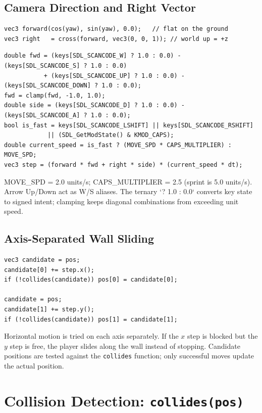 \subsection{Camera Direction and Right Vector}
\begin{verbatim}
vec3 forward(cos(yaw), sin(yaw), 0.0);   // flat on the ground
vec3 right   = cross(forward, vec3(0, 0, 1)); // world up = +z
\end{verbatim}
\begin{verbatim}
double fwd = (keys[SDL_SCANCODE_W] ? 1.0 : 0.0) - (keys[SDL_SCANCODE_S] ? 1.0 : 0.0)
           + (keys[SDL_SCANCODE_UP] ? 1.0 : 0.0) - (keys[SDL_SCANCODE_DOWN] ? 1.0 : 0.0);
fwd = clamp(fwd, -1.0, 1.0);
double side = (keys[SDL_SCANCODE_D] ? 1.0 : 0.0) - (keys[SDL_SCANCODE_A] ? 1.0 : 0.0);
bool is_fast = keys[SDL_SCANCODE_LSHIFT] || keys[SDL_SCANCODE_RSHIFT]
            || (SDL_GetModState() & KMOD_CAPS);
double current_speed = is_fast ? (MOVE_SPD * CAPS_MULTIPLIER) : MOVE_SPD;
vec3 step = (forward * fwd + right * side) * (current_speed * dt);
\end{verbatim}
MOVE\_SPD = 2.0 units/s; CAPS\_MULTIPLIER = 2.5 (sprint is 5.0 units/s). Arrow Up/Down act as W/S aliases. The ternary `? 1.0 : 0.0` converts key state to signed intent; clamping keeps diagonal combinations from exceeding unit speed.

\subsection{Axis-Separated Wall Sliding}
\begin{verbatim}
vec3 candidate = pos;
candidate[0] += step.x();
if (!collides(candidate)) pos[0] = candidate[0];

candidate = pos;
candidate[1] += step.y();
if (!collides(candidate)) pos[1] = candidate[1];
\end{verbatim}
Horizontal motion is tried on each axis separately. If the $x$ step is blocked but the $y$ step is free, the player slides along the wall instead of stopping. Candidate positions are tested against the \texttt{collides} function; only successful moves update the actual position.

\section{Collision Detection: \texttt{collides(pos)}}

